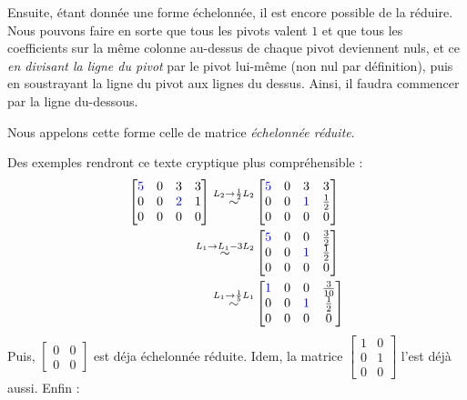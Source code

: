 \noindent Ensuite, étant donnée une forme échelonnée, il est encore possible de la réduire. Nous pouvons faire en sorte que tous les pivots valent $1$ et que tous les coefficients sur la même colonne au-dessus de chaque pivot deviennent nuls, et ce \textit{en divisant la ligne du pivot} par le pivot lui-même (non nul par définition), puis en soustrayant la ligne du pivot aux lignes du dessus. Ainsi, il faudra commencer par la ligne du-dessous.\\
\begin{boxdef}
Nous appelons cette forme celle de matrice \textit{échelonnée réduite}.\\
\end{boxdef}
Des exemples rendront ce texte cryptique  plus compréhensible :
\begin{align*}
\begin{bmatrix}
\color{blue}5 & 0 & 3 & 3\\
0 & 0 & \color{blue}2 & 1\\
0 & 0 & 0 & 0
\end{bmatrix} \overset{L_2 \to  \frac{1}{2}L_2}{\sim} 
&\begin{bmatrix}
\color{blue}5 & 0 & 3 & 3\\
0 & 0 & \color{blue}1 & \frac{1}{2}\\
0 & 0 & 0 & 0
\end{bmatrix}\\
\overset{L_1 \to L_1 - 3L_2}{\sim}
&\begin{bmatrix}
\color{blue}5 & 0 & 0 & \frac{3}{2}\\
0 & 0 & \color{blue}1 & \frac{1}{2}\\
0 & 0 & 0 & 0
\end{bmatrix}\\
\overset{L_1 \to \frac{1}{5}L_1}{\sim}
&\begin{bmatrix}
\color{blue}1 & 0 & 0 & \frac{3}{10}\\
0 & 0 & \color{blue}1 & \frac{1}{2}\\
0 & 0 & 0 & 0
\end{bmatrix}
\end{align*}
Puis, $\begin{bmatrix}
0 &0\\
0 & 0
\end{bmatrix}$ est déja échelonnée réduite. Idem, la matrice $\begin{bmatrix}
1 & 0\\
0 & 1\\
0 & 0
\end{bmatrix}$ l'est déjà aussi. Enfin :
